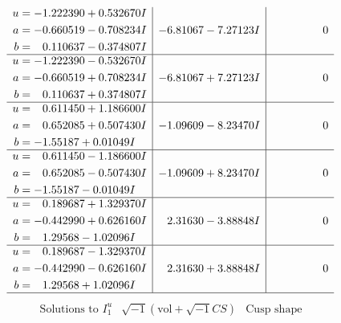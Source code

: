 \documentclass[1p]{elsarticle_modified}
\theoremstyle{definition}
\newcommand{\I}{\sqrt{-1}}
\begin{document}
$$\begin{array}{c|c|c}
\begin{aligned}
u &= -1.222390 + 0.532670 I \\
a &= -0.660519 - 0.708234 I \\
b &= \phantom{-}0.110637 - 0.374807 I\end{aligned}
 & -6.81067 - 7.27123 I & \phantom{-0.000000 } 0 \\ \hline\begin{aligned}
u &= -1.222390 - 0.532670 I \\
a &= -0.660519 + 0.708234 I \\
b &= \phantom{-}0.110637 + 0.374807 I\end{aligned}
 & -6.81067 + 7.27123 I & \phantom{-0.000000 } 0 \\ \hline\begin{aligned}
u &= \phantom{-}0.611450 + 1.186600 I \\
a &= \phantom{-}0.652085 + 0.507430 I \\
b &= -1.55187 + 0.01049 I\end{aligned}
 & -1.09609 - 8.23470 I & \phantom{-0.000000 } 0 \\ \hline\begin{aligned}
u &= \phantom{-}0.611450 - 1.186600 I \\
a &= \phantom{-}0.652085 - 0.507430 I \\
b &= -1.55187 - 0.01049 I\end{aligned}
 & -1.09609 + 8.23470 I & \phantom{-0.000000 } 0 \\ \hline\begin{aligned}
u &= \phantom{-}0.189687 + 1.329370 I \\
a &= -0.442990 + 0.626160 I \\
b &= \phantom{-}1.29568 - 1.02096 I\end{aligned}
 & \phantom{-}2.31630 - 3.88848 I & \phantom{-0.000000 } 0 \\ \hline\begin{aligned}
u &= \phantom{-}0.189687 - 1.329370 I \\
a &= -0.442990 - 0.626160 I \\
b &= \phantom{-}1.29568 + 1.02096 I\end{aligned}
 & \phantom{-}2.31630 + 3.88848 I & \phantom{-0.000000 } 0\\
 \hline 
 \end{array}$$\newpage$$\begin{array}{c|c|c}  
\text{Solutions to }I^u_{1}& \I (\text{vol} + \sqrt{-1}CS) & \text{Cusp shape}\\
 \hline 
\begin{aligned}

\end{aligned}
\end{array}$$
\end{document}
